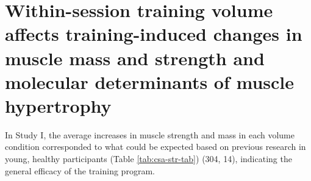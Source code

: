 \documentclass[twoside,10pt]{gihclass} %
\begin{document}
\hypertarget{muscle-mass-growth}{%
\section{Within-session training volume affects training-induced changes in muscle mass and strength and molecular determinants of muscle hypertrophy}\label{muscle-mass-growth}}

In Study I, the average increases in muscle strength and mass in each volume condition corresponded to what could be expected based on previous research in young, healthy participants (Table \ref{tab:csa-str-tab})
(304, 14),
indicating the general efficacy of the training program.




\begin{table}


\end{table}
\end{document}
